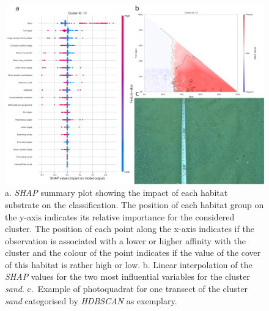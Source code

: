 \begin{figure}
\hypertarget{fig:chap2figS33}{%
\centering
\includegraphics{03-Chapitre2/figures/supplementary/05-explanation_shap_pq_cluster_13.png}
\caption{a. \emph{SHAP} summary plot showing the impact of each habitat
substrate on the classification. The position of each habitat group on
the y-axis indicates its relative importance for the considered cluster.
The position of each point along the x-axis indicates if the observation
is associated with a lower or higher affinity with the cluster and the
colour of the point indicates if the value of the cover of this habitat
is rather high or low. b. Linear interpolation of the \emph{SHAP} values
for the two most influential variables for the cluster \emph{sand}.
c.~Example of photoquadrat for one transect of the cluster \emph{sand}
categorised by \emph{HDBSCAN} as exemplary.}\label{fig:chap2figS33}
}
\end{figure}

